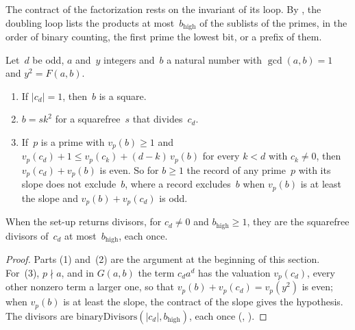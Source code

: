 The contract of the factorization rests on the invariant
 of its loop. By
, the doubling loop lists the products
at most~$b_{\mathrm{high}}$ of the sublists of the primes, in the order of binary counting, the
first prime the lowest bit, or a prefix of them.

\begin{lemma}\label{lem:odd_denominators}
  \leanok
  Let~$d$ be odd, $a$ and~$y$ integers and~$b$ a natural number with $\gcd(a, b) = 1$ and
  $y^2 = F(a, b)$.
  \begin{enumerate}
    \item If $|c_d| = 1$, then~$b$ is a square.
    \item $b = s k^2$ for a squarefree~$s$ that divides~$c_d$.
    \item If~$p$ is a prime with $v_p(b) \ge 1$ and $v_p(c_d) + 1 \le v_p(c_k) + (d - k)\, v_p(b)$
      for every $k < d$ with $c_k \ne 0$, then $v_p(c_d) + v_p(b)$ is even. So for $b \ge 1$ the
      record of any prime~$p$ with its slope does not exclude~$b$, where a record excludes~$b$ when
      $v_p(b)$ is at least the slope and $v_p(b) + v_p(c_d)$ is odd.
  \end{enumerate}
  When the set-up returns divisors, for $c_d \ne 0$ and $b_{\mathrm{high}} \ge 1$, they are the
  squarefree divisors of~$c_d$ at most~$b_{\mathrm{high}}$, each once.
\end{lemma}

\begin{proof}
  \leanok
  Parts (1) and~(2) are the argument at the beginning of this section. For~(3), $p \nmid a$, and in
  $G(a, b)$ the term $c_d a^d$ has the valuation $v_p(c_d)$, every other nonzero term a larger one,
  so that $v_p(b) + v_p(c_d) = v_p(y^2)$ is even; when $v_p(b)$ is at least the slope, the contract
  of the slope gives the hypothesis. The divisors
  are $\mathrm{binaryDivisors}(|c_d|, b_{\mathrm{high}})$, each once
  (, ).
\end{proof}

